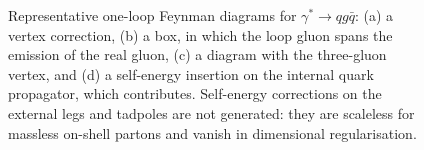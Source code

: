 \begin{figure}[h!]
\caption{Representative one-loop Feynman diagrams for $\gamma^*\to qg\bar q$: (a) a vertex correction, (b) a box, in which the loop gluon spans the emission of the real gluon, (c) a diagram with the three-gluon vertex, and (d) a self-energy insertion on the internal quark propagator, which contributes. Self-energy corrections on the external legs and tadpoles are not generated: they are scaleless for massless on-shell partons and vanish in dimensional regularisation.}
\label{fig:diagA31}
\end{figure}
